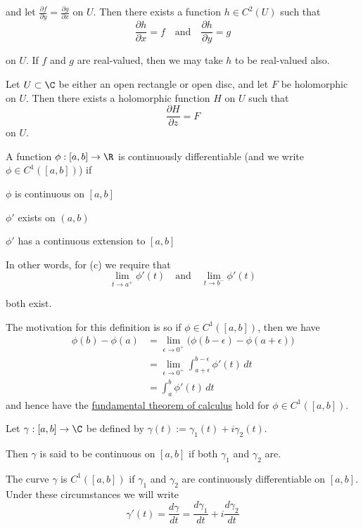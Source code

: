 and let $\displaystyle\frac{\partial f}{\partial y}=\frac{\partial
		g}{\partial x}$ on $U$. Then there exists a function $h\in C^2(U)$
such that
$$
	\frac{\partial h}{\partial x}=f
	\quad\text{and}\quad
	\frac{\partial h}{\partial y}=g
$$

on $U$. If $f$ and $g$ are real-valued, then we may take $h$ to be
real-valued also.

\label{e7808d1}

Let $U\subset\C$ be either an open rectangle or open disc, and let $F$
be holomorphic on $U$. Then there exists a holomorphic function $H$ on
$U$ such that
$$
	\frac{\partial H}{\partial z}=F
$$
on $U$.

\label{c1f6d35}

A function $\phi:[a,b]\to\R$ is continuously differentiable
(and we write $\phi\in C^1([a,b])$) if

\begin{enumerata}
	\item $\phi$ is continuous on $[a,b]$
	\item $\phi'$ exists on $(a,b)$
	\item $\phi'$ has a continuous extension to $[a,b]$
\end{enumerata}

In other words, for (c) we require that
$$
	\lim_{t\to a^+}\phi'(t)\quad\text{and}\quad\lim_{t\to b^-}\phi'(t)
$$

both exist.

The motivation for this definition is so if $\phi\in C^1([a,b])$, then
we have
\begin{align*}
	\phi(b)-\phi(a)
	 & =\lim_{\epsilon\to0^+}\big(\phi(b-\epsilon)-\phi(a+\epsilon)\big) \\
	 & =\lim_{\epsilon\to0^+}\int_{a+\epsilon}^{b-\epsilon}\phi'(t)\,dt  \\
	 & =\int_a^b\phi'(t)\,dt
\end{align*}
and hence have the \href{b869dc0}{fundamental theorem of calculus}
hold for $\phi\in C^1([a,b])$.

\label{e4132bc}

Let $\gamma:[a,b]\to\C$ be defined by $\gamma(t):=\gamma_1(t) +
	i\gamma_2(t)$.

Then $\gamma$ is said to be continuous on $[a,b]$ if both $\gamma_1$
and $\gamma_2$ are.

The curve $\gamma$ is $C^1([a,b])$ if $\gamma_1$ and $\gamma_2$ are
continuously differentiable on $[a,b]$. Under these circumstances we
will write
$$
	\gamma'(t)=\frac{d\gamma}{dt}=\frac{d\gamma_1}{dt}+i\frac{d\gamma_2}{dt}
$$

